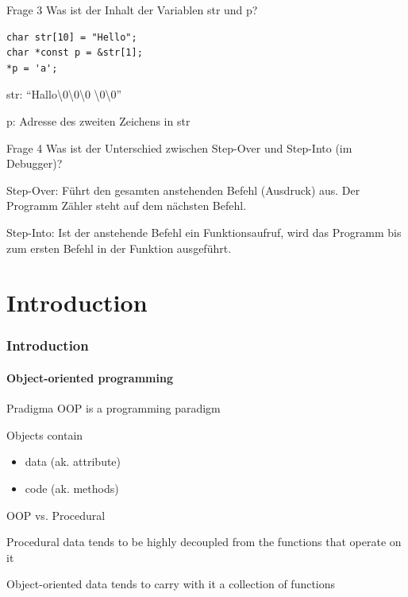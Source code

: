 \documentclass{beamer}
\begin{document}
\begin{frame}[fragile]{Frage 3}
Was ist der Inhalt der Variablen str und p?
\begin{lstlisting}
char str[10] = "Hello";
char *const p = &str[1];
*p = 'a';
\end{lstlisting}

str:
\textquotedblleft{}Hallo\textbackslash0\textbackslash0\textbackslash0
                      \textbackslash0\textbackslash0\textquotedblright

p: Adresse des zweiten Zeichens in str
\end{frame}

\begin{frame}[fragile]{Frage 4}
Was ist der Unterschied zwischen Step-Over und Step-Into (im Debugger)?

Step-Over: Führt den gesamten anstehenden Befehl (Ausdruck) aus. Der Programm
Zähler steht auf dem nächsten Befehl.

Step-Into: Ist der anstehende Befehl ein Funktionsaufruf, wird das Programm 
bis zum ersten Befehl in der Funktion ausgeführt.
\end{frame}


\part{Introduction}

\section{Introduction}

\subsection{Object-oriented programming}

\begin{frame}{Pradigma}
OOP is a programming paradigm
\begin{block}{Objects contain}
\begin{itemize}
\item data (ak. attribute)
\item code (ak. methods)
\end{itemize}
\end{block}
\end{frame}

\begin{frame}{OOP vs. Procedural}

\begin{block}{Procedural}
data tends to be highly decoupled from the functions that operate on it
\end{block}

\begin{block}{Object-oriented}
data tends to carry with it a collection of functions
\end{block}

\end{frame}
\end{document}
